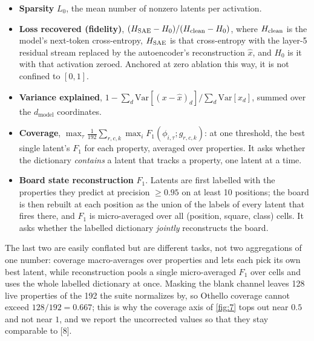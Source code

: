 \documentclass{article}
\begin{document}
\begin{itemize}
\item \textbf{Sparsity} $L_0$, the mean number of nonzero latents per activation.

\item \textbf{Loss recovered (fidelity)}, $(H_{\rm SAE} - H_0)/(H_{\rm clean} - H_0)$, where
$H_{\rm clean}$ is the model's next-token cross-entropy, $H_{\rm SAE}$ is that cross-entropy with
the layer-5 residual stream replaced by the autoencoder's reconstruction $\hat{x}$, and $H_0$ is it
with that activation zeroed. Anchored at zero ablation this way, it is not confined to $[0, 1]$.

\item \textbf{Variance explained}, $1 - \sum_d \mathrm{Var}[(x - \hat{x})_d] / \sum_d \mathrm{Var}[x_d]$,
summed over the $d_{\mathrm{model}}$ coordinates.

\item \textbf{Coverage}, $\max_{\tau} \frac{1}{192} \sum_{r,c,k} \max_i F_1(\phi_{i,\tau}; g_{r,c,k})$:
at one threshold, the best single latent's $F_1$ for each property, averaged over properties. It
asks whether the dictionary \textit{contains} a latent that tracks a property, one latent at a time.

\item \textbf{Board state reconstruction} $F_1$. Latents are first labelled with the properties they
predict at precision $\ge 0.95$ on at least 10 positions; the board is then rebuilt at each position
as the union of the labels of every latent that fires there, and $F_1$ is micro-averaged over all
(position, square, class) cells. It asks whether the labelled dictionary \textit{jointly}
reconstructs the board.
\end{itemize}

The last two are easily conflated but are different tasks, not two aggregations of one number:
coverage macro-averages over properties and lets each pick its own best latent, while
reconstruction pools a single micro-averaged $F_1$ over cells and uses the whole labelled
dictionary at once. Masking the blank channel leaves 128 live properties of the 192 the suite
normalizes by, so Othello coverage cannot exceed $128/192 = 0.667$; this is why the coverage axis
of \cref{fig:7} tops out near $0.5$ and not near $1$, and we report the uncorrected values so that
they stay comparable to [8].

\end{document}
